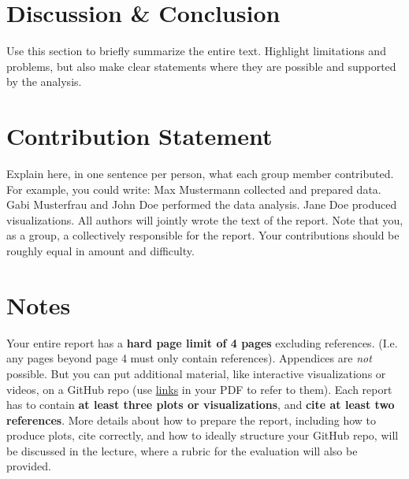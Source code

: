 \documentclass{article}
\begin{document}
\section{Discussion \& Conclusion}\label{sec:conclusion}

Use this section to briefly summarize the entire text. Highlight limitations and problems, but also make clear statements where they are possible and supported by the analysis. 

\section*{Contribution Statement}

Explain here, in one sentence per person, what each group member contributed. For example, you could write: Max Mustermann collected and prepared data. Gabi Musterfrau and John Doe performed the data analysis. Jane Doe produced visualizations. All authors will jointly wrote the text of the report. Note that you, as a group, a collectively responsible for the report. Your contributions should be roughly equal in amount and difficulty.

\section*{Notes} 

Your entire report has a \textbf{hard page limit of 4 pages} excluding references. (I.e. any pages beyond page 4 must only contain references). Appendices are \emph{not} possible. But you can put additional material, like interactive visualizations or videos, on a GitHub repo (use \href{https://github.com/pnkraemer/tueplots}{links} in your PDF to refer to them). Each report has to contain \textbf{at least three plots or visualizations}, and \textbf{cite at least two references}. More details about how to prepare the report, including how to produce plots, cite correctly, and how to ideally structure your GitHub repo, will be discussed in the lecture, where a rubric for the evaluation will also be provided.




\end{document}
